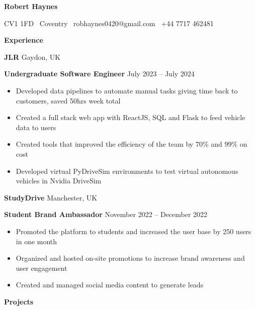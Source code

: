\documentclass[11pt]{article}
\begin{document}
\begin{center}
    \textbf{Robert Haynes}\\ 
    \hrulefill
\end{center}

\begin{center}
    CV1 1FD \textbullet \ Coventry \textbullet \ robhaynes0420@gmail.com \textbullet \ +44 7717 462481
\end{center}

\vspace{0.5pt}

\begin{center}
    \textbf{Experience}
\end{center}
\textbf{JLR} \hfill Gaydon, UK

\textbf{Undergraduate Software Engineer} \hfill July 2023 – July 2024
\begin{itemize}[noitemsep, topsep=0pt, partopsep=0pt, parsep=0pt]
    \item Developed data pipelines to automate manual tasks giving time back to customers, saved 50hrs week total
    \item Created a full stack web app with ReactJS, SQL and Flask to feed vehicle data to users
    \item Created tools that improved the efficiency of the team by 70\% and 99\% on cost 
    \item Developed virtual PyDriveSim environments to test virtual autonomous vehicles in Nvidia DriveSim
\end{itemize}

\vspace{12pt}

\textbf{StudyDrive} \hfill Manchester, UK

\textbf{Student Brand Ambassador} \hfill November 2022 – December 2022
\begin{itemize}[noitemsep, topsep=0pt, partopsep=0pt, parsep=0pt]
    \item Promoted the platform to students and increased the user base by 250 users in one month
    \item Organized and hosted on-site promotions to increase brand awareness and user engagement
    \item Created and managed social media content to generate leads
\end{itemize}

\begin{center}
    \textbf{Projects}
\end{center}
\end{document}
